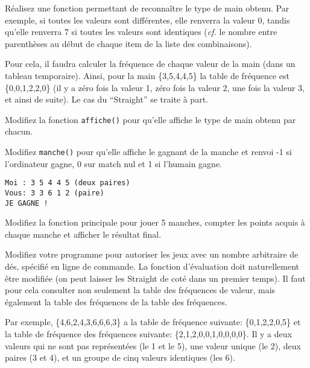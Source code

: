 \documentclass[10pt]{article}\usepackage[nu]{esial}
\begin{document}
\begin{Exercice}
  \Question Réalisez une fonction  permettant
  de reconnaître le type de main obtenu. Par exemple, si toutes les valeurs
  sont différentes, elle renverra la valeur 0, tandis qu'elle renverra 7 si
  toutes les valeurs sont identiques (\textit{cf.} le nombre entre parenthèses
  au début de chaque item de la liste des combinaisons).

  Pour cela, il faudra calculer la fréquence de chaque valeur de la main (dans
  un tableau temporaire). Ainsi, pour la main \{3,5,4,4,5\} la table de
  fréquence est \{0,0,1,2,2,0\} (il y a zéro fois la valeur 1, zéro fois la
  valeur 2, une fois la valeur 3, et ainsi de suite). Le cas du ``Straight'' se
  traite à part.

  \Question Modifiez la fonction \texttt{affiche()} pour qu'elle affiche le
  type de main obtenu par chacun.

  \noindent\begin{minipage}{.62\linewidth}

    \Question Modifiez \texttt{manche()} pour qu'elle affiche le gagnant de la
    manche et renvoi -1 si l'ordinateur gagne, 0 sur match nul et 1 si l'humain
    gagne. 

  \end{minipage}\hfill\begin{minipage}{.35\linewidth}
    \begin{Verbatim}
Moi : 3 5 4 4 5 (deux paires)
Vous: 3 3 6 1 2 (paire)
JE GAGNE !
    \end{Verbatim}
  \end{minipage}

  \Question Modifiez la fonction principale pour jouer 5 manches, compter
  les points acquis à chaque manche et afficher le résultat final.

  \Question Modifiez votre programme pour autoriser les jeux avec un nombre
  arbitraire de dés, spécifié en ligne de commande. La fonction d'évaluation
  doit naturellement être modifiée (on peut laisser les Straight de coté dans
  un premier temps).  Il faut pour cela consulter non seulement la table des
  fréquences de valeur, mais également la table des fréquences de la table des
  fréquences. 

  Par exemple, \{4,6,2,4,3,6,6,6,3\} a la table de fréquence suivante:
  \{0,1,2,2,0,5\} et la table de fréquence des fréquences suivante:
  \{2,1,2,0,0,1,0,0,0,0\}. Il y a deux valeurs qui ne sont pas représentées 
  (le 1 et le 5), une valeur unique (le 2), deux paires (3 et 4), et
  un groupe de cinq valeurs identiques (les 6). 



\end{Exercice}
\end{document}
